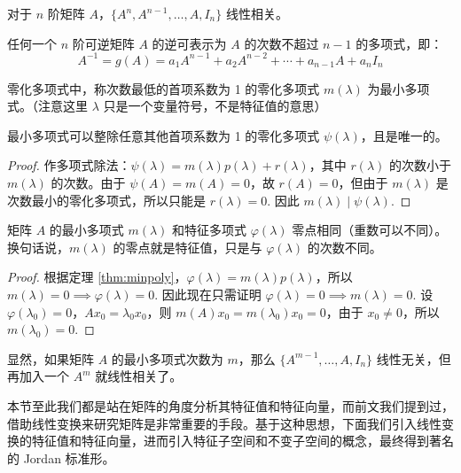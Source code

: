 \begin{corollary}
对于 $n$ 阶矩阵 $A$，$\{A^n,A^{n-1},\ldots,A,I_n\}$ 线性相关。
\end{corollary}

\begin{corollary}
\label{cor:invpoly}
任何一个 $n$ 阶可逆矩阵 $A$ 的逆可表示为 $A$ 的次数不超过 $n-1$ 的多项式，即：
\[A^{-1}=g(A)=a_1A^{n-1}+a_2A^{n-2}+\cdots+a_{n-1}A+a_nI_n\]
\end{corollary}

\begin{definition}[最小多项式]
零化多项式中，称次数最低的首项系数为 1 的零化多项式 $m(\lambda)$ 为最小多项式。（注意这里 $\lambda$ 只是一个变量符号，不是特征值的意思）
\end{definition}

\begin{theorem}
\label{thm:minpoly}
最小多项式可以整除任意其他首项系数为 1 的零化多项式 $\psi(\lambda)$，且是唯一的。
\end{theorem}
\begin{proof}
作多项式除法：$\psi(\lambda)=m(\lambda)p(\lambda)+r(\lambda)$，其中 $r(\lambda)$ 的次数小于 $m(\lambda)$ 的次数。由于 $\psi(A)=m(A)=0$，故 $r(A)=0$，但由于 $m(\lambda)$ 是次数最小的零化多项式，所以只能是 $r(\lambda)=0$.  因此 $m(\lambda)\mid\psi(\lambda)$.
\end{proof}

\begin{theorem}
矩阵 $A$ 的最小多项式 $m(\lambda)$ 和特征多项式 $\varphi(\lambda)$ 零点相同（重数可以不同）。换句话说，$m(\lambda)$ 的零点就是特征值，只是与 $\varphi(\lambda)$ 的次数不同。
\end{theorem}
\begin{proof}
根据定理 \ref{thm:minpoly}，$\varphi(\lambda)=m(\lambda)p(\lambda)$，所以 $m(\lambda)=0\implies \varphi(\lambda)=0$. 因此现在只需证明 $\varphi(\lambda)=0\implies m(\lambda)=0$.
设 $\varphi(\lambda_0)=0$，$A x_0=\lambda_0 x_0$，则 $m(A) x_0=m(\lambda_0) x_0=0$，由于 $x_0\neq 0$，所以 $m(\lambda_0)=0$.
\end{proof}

\begin{com}
显然，如果矩阵 $A$ 的最小多项式次数为 $m$，那么 $\{A^{m-1},\ldots,A,I_n\}$ 线性无关，但再加入一个 $A^m$ 就线性相关了。
\end{com}

本节至此我们都是站在矩阵的角度分析其特征值和特征向量，而前文我们提到过，借助线性变换来研究矩阵是非常重要的手段。基于这种思想，下面我们引入线性变换的特征值和特征向量，进而引入特征子空间和不变子空间的概念，最终得到著名的 Jordan 标准形。


